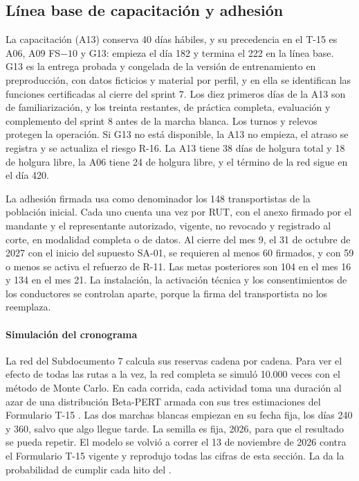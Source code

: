 \subsection{Línea base de capacitación y adhesión}\label{sec:8-acuerdo-capacitacion-adhesion}

La capacitación (A13) conserva 40 días hábiles, y su precedencia en el T-15 es A06, A09 FS$-10$ y G13:
empieza el día 182 y termina el 222 en la línea base. G13 es la entrega probada y congelada de la versión
de entrenamiento en preproducción, con datos ficticios y material por perfil, y en ella se identifican
las funciones certificadas al cierre del sprint 7. Los diez primeros días de la A13 son de
familiarización, y los treinta restantes, de práctica completa, evaluación y complemento del sprint 8
antes de la marcha blanca. Los turnos y relevos protegen la operación. Si G13 no está disponible, la A13
no empieza, el atraso se registra y se actualiza el riesgo R-16. La A13 tiene 38 días de holgura total y
18 de holgura libre, la A06 tiene 24 de holgura libre, y el término de la red sigue en el día 420.

La adhesión firmada usa como denominador los 148 transportistas de la población inicial. Cada uno cuenta
una vez por RUT, con el anexo firmado por el mandante y el representante autorizado, vigente, no revocado
y registrado al corte, en modalidad completa o de datos. Al cierre del mes 9, el 31 de octubre de 2027
con el inicio del supuesto SA-01, se requieren al menos 60 firmados, y con 59 o menos se activa el
refuerzo de R-11. Las metas posteriores son 104 en el mes 16 y 134 en el mes 21. La instalación, la
activación técnica y los consentimientos de los conductores se controlan aparte, porque la firma del
transportista no los reemplaza.

\paragraph{Simulación del cronograma}
La red del Subdocumento 7 calcula sus reservas cadena por cadena. Para ver el efecto de todas las rutas a
la vez, la red completa se simuló 10.000 veces con el método de Monte Carlo. En cada corrida, cada
actividad toma una duración al azar de una distribución Beta-PERT armada con sus tres estimaciones del
Formulario T-15 \parencite{malcolm1959}. Las dos marchas blancas empiezan en su fecha fija, los días 240
y 360, salvo que algo llegue tarde. La semilla es fija, 2026, para que el resultado se pueda repetir. El
modelo se volvió a correr el 13 de noviembre de 2026 contra el Formulario T-15 vigente y reprodujo todas
las cifras de esta sección. La
 da la probabilidad de cumplir cada hito del .

